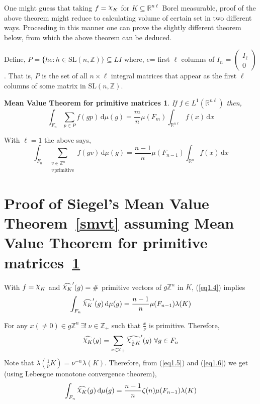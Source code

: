 \documentclass[11pt]{article}
\newtheorem{smvtp}[theorem]{Mean Value Theorem for primitive matrices}
\theoremstyle{definition}
\newcommand{\mychi}{\raisebox{2pt}{$\chi$}}
\begin{document}
One might guess that taking $f= \mychi _K$ for $K \subseteq \mathbb{R}^{n \ell}$ Borel measurable, proof of the above theorem might reduce to calculating volume of certain set in two different ways.
Proceeding in this manner one can prove the slightly different theorem below, from which the above theorem can be deduced.

Define, $P = \{he: h \in \mathrm{SL}(n,  \mathbb{Z})\} \subseteq LI$ where, $e$= first $\ell$ columns of $I_n$ = $
\begin{pmatrix}
    I_ \ell \\
    0
\end{pmatrix}$.
That is, $P$ is the set of all $n \times \ell$ integral matrices that appear as the first $\ell$ columns of some matrix in $\mathrm{SL}(n,\mathbb{Z})$.

\begin{smvtp}\label{smvtp}
    If $f \in L^1(\mathbb{R}^{n\ell })$ then,
    \[
        \int_{F_n} \displaystyle\sum_{p \in P} f(gp) \, \mathrm{d} \mu (g)= \frac{m}{n} \mu (F_m) \int_{\mathbb{R}^{n \ell }}f(x) \, \mathrm{d} x
    \]
\end{smvtp}

With $\ell=1$ the above says,
\begin{equation}\label{eq1.4}
    \int_{F_n} \displaystyle\sum_{\substack{v \in \mathbb{Z}^n \\ v \,\text{primitive}}} f(gv) \, \mathrm{d} \mu (g) = \frac{n-1}{n} \mu (F_{n-1}) \int_{\mathbb{R}^n} f(x) \, \mathrm{d} x
\end{equation}
\section{Proof of Siegel's Mean Value Theorem~\ref{smvt} assuming Mean Value Theorem for primitive matrices~\ref{smvtp}}\label{secn1.5}
With $f=\mychi _K$ and $\widehat{\mychi _{K}}'(g)=\#$ primitive vectors of $g \mathbb{Z}^n$ in $K$, (\ref{eq1.4}) implies
\begin{equation}\label{eq1.5}
    \int_{F_n}\widehat{\mychi _{K}}'(g) \, \mathrm{d} \mu (g) = \frac{n-1}{n} \mu (F_{n-1}) \lambda (K)
\end{equation}

For any  $x( \neq 0) \in g \mathbb{Z}^n \ \exists! \ \nu \in \mathbb{Z}_+$ such that $\frac{x}{ \nu }$ is primitive.
Therefore,
\begin{equation}\label{eq1.6}
    \widehat{\mychi _{K}} (g) = \displaystyle\sum_{\nu \in \mathbb{Z}_+ } \widehat{\mychi _{\frac{1}{\nu }K}}'(g) \ \forall g \in F_n
\end{equation}
Note that $\lambda (\frac{1}{\nu }K) = \nu ^{-n} \lambda (K)$. Therefore, from (\ref{eq1.5}) and (\ref{eq1.6}) we get (using Lebesgue monotone convergence theorem),
\begin{equation}\label{eq1.7}
    \int_{F_n} \widehat{\mychi _{K}}(g) \, \mathrm{d} \mu (g) = \frac{n-1}{n} \zeta (n) \mu (F_{n-1}) \lambda (K)
\end{equation}
\end{document}
